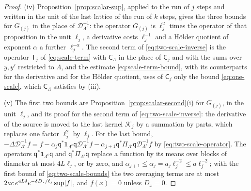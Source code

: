 \documentclass[11pt]{preprint}
\DeclarePairedDelimiter{\abs}{\lvert}{\rvert}
\numberwithin{equation}{section}
\theoremstyle{definition}
\theoremstyle{remark}
\theoremstyle{plain}
\begin{document}
\begin{proof}
(iv) Proposition~\ref{prop:scalar-sup}, applied to the run of $j$ steps and written in the unit of the last lattice of the run of $k$ steps, gives the three bounds for $G_{(j)}$ in the place of $\mathcal D_{\Lambda'}^{-1}$: the operator $G_{(j)}$ is $\ell_j^2$ times the operator of that proposition in the unit $\ell_j$, a derivative costs $\ell_j^{-1}$ and a H\"older quotient of exponent $\alpha$ a further $\ell_j^{-\alpha}$. The second term of \eqref{eq:two-scale-inverse} is the operator $\mathsf T_j$ of \eqref{eq:scale-term} with $\mathsf C_\Lambda$ in the place of $\mathsf C_j$ and with the sums over $y, y'$ restricted to $\Lambda$, and the estimate \eqref{eq:scale-term-bound}, with its counterparts for the derivative and for the H\"older quotient, uses of $\mathsf C_j$ only the bound \eqref{eq:one-scale}, which $\mathsf C_\Lambda$ satisfies by (iii).

(v) The first two bounds are Proposition~\ref{prop:scalar-second}(i) for $G_{(j)}$, in the unit $\ell_j$, and its proof for the second term of \eqref{eq:two-scale-inverse}: the derivative of the source is moved to the last kernel $\mathcal K_j$ by a summation by parts, which replaces one factor $\ell_j^2$ by $\ell_j$. For the last bound, $-\Delta\mathcal D_{\Lambda'}^{-1}f = f - \alpha_j\mathsf q^*\mathbf 1_{\Lambda^c}\mathsf q\mathcal D_{\Lambda'}^{-1}f - \alpha_{j+1}\mathsf q^*\Pi_{\Lambda'}\mathsf q\mathcal D_{\Lambda'}^{-1}f$ by \eqref{eq:two-scale-operator}. The operators $\mathsf q^*\mathbf 1_{\Lambda^c}\mathsf q$ and $\mathsf q^*\Pi_{\Lambda'}\mathsf q$ replace a function by its means over blocks of diameter at most $4L\ell_j$, or by zero, and $\alpha_{j+1} \leq \alpha_j = a_j\ell_j^{-2} \leq a\ell_j^{-2}$; with the first bound of \eqref{eq:two-scale-bounds} the two averaging terms are at most $2ac\,e^{4L\delta}e^{-\delta D_x/\ell_j}\sup\abs f$, and $f(x) = 0$ unless $D_x = 0$.
\end{proof}
\end{document}
